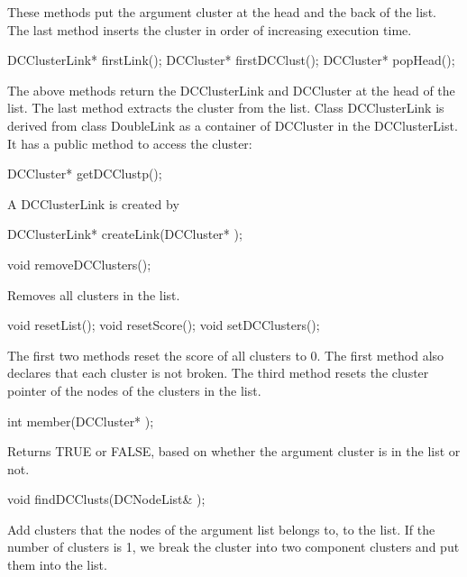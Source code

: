 These methods put the argument cluster at the head and the back of the list.
The last method inserts the cluster in order of increasing execution time.

\begin{example}
DCClusterLink* firstLink();
DCCluster* firstDCClust();
DCCluster* popHead();
\end{example}

The above methods return the DCClusterLink and DCCluster at the head of the
list. The last method extracts the cluster from the list.
Class DCClusterLink is derived from class DoubleLink as a
container of DCCluster in the DCClusterList. It has a public method to
access the cluster:

\begin{example}
DCCluster* getDCClustp();
\end{example}

A DCClusterLink is created by

\begin{example}
DCClusterLink* createLink(DCCluster* );
\end{example}

\begin{example}
void removeDCClusters();
\end{example}

Removes all clusters in the list.

\begin{example}
void resetList();
void resetScore();
void setDCClusters();
\end{example}

The first two methods reset the score of all clusters to 0. The first method
also declares that each cluster is not broken. The third method resets the
cluster pointer of the nodes of the clusters in the list.

\begin{example}
int member(DCCluster* );
\end{example}

Returns TRUE or FALSE, based on whether the argument cluster is in the list or
not.

\begin{example}
void findDCClusts(DCNodeList& );
\end{example}

Add clusters that the nodes of the argument list belongs to, to the list.
If the number of clusters is 1, we break the cluster into two
component clusters and put them into the list.

